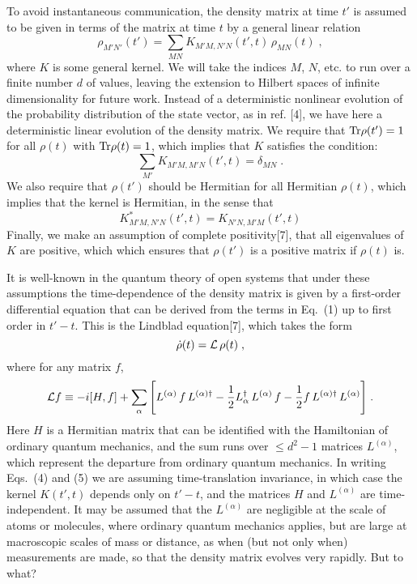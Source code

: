 To avoid instantaneous communication, the density matrix at time $t'$ is assumed to be given in terms of the matrix at time $t$ by a general linear relation
\begin{equation}
\rho_{M'N'}(t')=\sum_{MN}K_{M'M,N'N}(t',t)\,\rho_{MN}(t)\;,
\end{equation}
where $K$ is some  general kernel.   We will take the indices $M$, $N$, etc. to run over a finite number $d$ of values, leaving the extension to Hilbert spaces of infinite dimensionality for future work.  Instead of a deterministic nonlinear evolution of the probability distribution of the state vector, as in ref. [4], we have here a deterministic linear evolution of the density matrix.
We  require that ${\rm Tr}\rho(t')=1$ for all $\rho(t)$ with ${\rm Tr}\rho(t)=1$, which implies that  $K$ satisfies the condition:
\begin{equation}
\sum_{M'}K_{M'M,M'N}(t',t)=\delta_{MN}\;.
\end{equation}
We also require that $\rho(t')$ should be Hermitian for all Hermitian $\rho(t)$, which implies that the kernel is  Hermitian, in the sense that
\begin{equation}
K^*_{M'M,N'N}(t',t)=K_{N'N,M'M}(t',t)
\end{equation}
Finally, we make an assumption of complete positivity[7], that all eigenvalues of 
$K$ are positive, which  which ensures that $\rho(t')$ is a positive matrix if $ \rho(t)$ is.



It is well-known in the quantum theory of open systems that under these assumptions the time-dependence of the density matrix is given by a  first-order differential equation that can be derived from the terms in Eq.~(1) up to first order in $t'-t$.  This is the Lindblad equation[7], which takes the form
\begin{equation}
\dot{\rho}(t)={\cal L}\,\rho(t)\;,
\end{equation}
where for any matrix $f$,
\begin{eqnarray}
&& {\cal L}f\equiv -i[H,f]+\sum_\alpha \Bigg[L^{(\alpha)}\,f\,L^{(\alpha)\dagger}
-\frac{1}{2}L^\dagger_\alpha\,L^{(\alpha)}\,f
-\frac{1}{2}f\,L^{(\alpha)\dagger}\,L^{(\alpha)}\Bigg]\;.~~~
\end{eqnarray}
Here $H$ is a Hermitian matrix that can be identified with the Hamiltonian of ordinary quantum mechanics, and  the sum  runs over  $\leq d^2-1$ matrices $L^{(\alpha)}$, which represent the departure from ordinary quantum mechanics.  In writing Eqs.~(4) and (5) we are assuming time-translation invariance, in which case the kernel $K(t',t)$ depends only on $t'-t$, and the matrices $H$ and 
$L^{(\alpha)}$ are time-independent.  
It may be assumed that the $L^{(\alpha)}$ are negligible at the scale of atoms or molecules, where ordinary quantum mechanics applies, but are large at macroscopic scales of mass or distance, as when (but not only when) measurements are made, so that the density matrix evolves very rapidly.  But to what?

